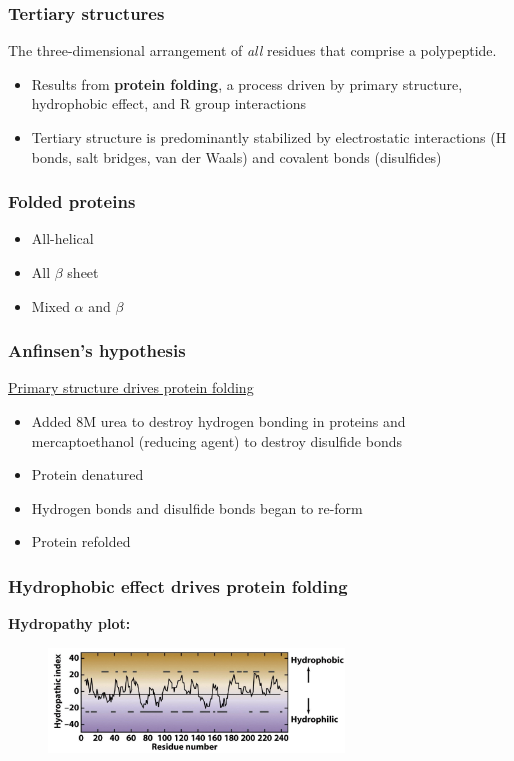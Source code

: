 \documentclass[letterpaper, 12pt]{article}
\begin{document}
\subsubsection*{Tertiary structures}
The three-dimensional arrangement of \textit{all} residues that comprise a polypeptide. 

\begin{itemize}
\item Results from \textbf{protein folding}, a process driven by primary structure, hydrophobic effect, and R group interactions
\item Tertiary structure is predominantly stabilized by electrostatic interactions (H bonds, salt bridges, van der Waals) and covalent bonds (disulfides)
\end{itemize}

\subsubsection*{Folded proteins}
\begin{itemize}
\item All-helical
\item All $\beta$ sheet
\item Mixed $\alpha$ and $\beta$
\end{itemize}

\subsubsection*{Anfinsen's hypothesis}
\underline{Primary structure drives protein folding}

\begin{itemize}
\item Added 8M urea to destroy hydrogen bonding in proteins and mercaptoethanol (reducing agent) to destroy disulfide bonds
\item Protein denatured
\item Hydrogen bonds and disulfide bonds began to re-form
\item Protein refolded
\end{itemize}

\subsubsection*{Hydrophobic effect drives protein folding}

\textbf{Hydropathy plot:}

\begin{figure}[H]
\centering
\includegraphics[width=0.7\textwidth]{hydropathy}
\end{figure}
\end{document}
